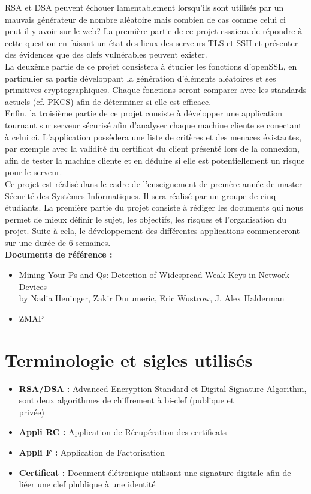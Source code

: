 \documentclass[a4paper,11pt,french]{article}
\begin{document}
RSA et DSA peuvent échouer lamentablement lorsqu’ils sont utilisés par un mauvais générateur de nombre aléatoire mais combien de cas comme celui ci peut-il y avoir sur le web? La première partie de ce projet essaiera de répondre à cette question en faisant un état des lieux des serveurs TLS et SSH et présenter des évidences que des clefs vulnérables peuvent exister.\\

La deuxème partie de ce projet consistera à étudier les fonctions d’openSSL, en particulier sa partie développant la génération d’éléments aléatoires et ses primitives cryptographiques. Chaque fonctions seront comparer avec les standards actuels (cf. PKCS) afin de déterminer si elle est efficace.\\

Enfin, la troisième partie de ce projet consiste à développer une application tournant sur serveur sécurisé afin d’analyser chaque machine cliente se conectant à celui ci. L’application possèdera une liste de critères et des menaces éxistantes, par exemple avec la validité du certificat du client présenté lors de la connexion,  afin de tester la machine cliente et en déduire si elle est potentiellement un risque pour le serveur.\\


Ce projet est réalisé dans le cadre de l’enseignement de premère année de master Sécurité des Systèmes Informatiques. Il sera réalisé par un groupe de cinq étudiants. La première partie du projet consiste à rédiger les documents qui nous permet de mieux définir le sujet, les objectifs, les risques et l’organisation du projet. Suite à cela, le développement des différentes applications commenceront sur une durée de 6 semaines. \\

\textbf{Documents de référence :}
\begin{itemize}
  \item Mining Your Ps and Qs: Detection of Widespread Weak Keys in Network Devices \\
  		{\centering by Nadia Heninger, Zakir Durumeric, Eric Wustrow, J. Alex Halderman}
  \item ZMAP
\end{itemize}


\section{Terminologie et sigles utilisés}
\begin{itemize}
	\item \textbf{RSA/DSA :}  Advanced Encryption Standard et Digital Signature Algorithm, sont deux algorithmes de chiffrement à bi-clef (publique et \\ privée)
	\item \textbf{Appli RC :} Application de Récupération des certificats
	\item \textbf{Appli F :} Application de Factorisation
	\item \textbf{Certificat :} Document élétronique utilisant une signature digitale afin de liéer une clef plublique à une identité
\end{itemize}
\end{document}
